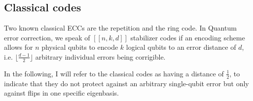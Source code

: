 \subsection{Classical codes}


Two known classical ECCs are the repetition and the ring code.
 In Quantum error correction, we speak of $[[n,k,d]]$ stabilizer
codes if an encoding scheme allows for $n$ physical qubits to 
encode $k$ logical qubits to an error distance of $d$, i.e. 
$\lfloor \frac{d-1}{2} \rfloor$ arbitrary individual errors being corrigible.

In the following, I will refer to the classical codes as having a 
distance of $\frac{1}{2}$, to indicate that they do not protect against an
arbitrary single-qubit error but only against flips in one specific eigenbasis.

\newpage
